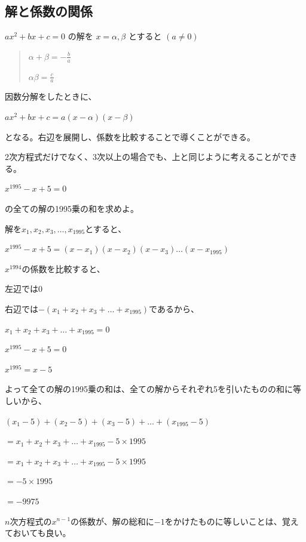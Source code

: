 \documentclass[uplatex,dvipdfmx]{jsbook}
\begin{document}
\subsection{解と係数の関係}

$ax^2+bx+c=0$
の解を
$x=\alpha,\beta$
とすると
$\left(a\neq0\right)$
\begin{quote}
    $\displaystyle \alpha+\beta=-\frac{b}{a}$

    $\displaystyle \alpha\beta=\frac{c}{a}$
\end{quote}
因数分解をしたときに、

$ax^2+bx+c=a\left(x-\alpha\right)\left(x-\beta\right)$

となる。右辺を展開し、係数を比較することで導くことができる。

2次方程式だけでなく、3次以上の場合でも、上と同じように考えることができる。

\begin{problem}[練習問題1]
    $x^{1995}-x+5=0$

    の全ての解の1995乗の和を求めよ。
\end{problem}

\begin{answer}
    解を$x_1,x_2,x_3,\dots,x_{1995}$とすると、

    $x^{1995}-x+5=\left(x-x_1\right)\left(x-x_2\right)\left(x-x_3\right)\dots \left(x-x_{1995}\right)$

    $x^{1994}$の係数を比較すると、

    左辺では$0$

    右辺では$-\left(x_1+x_2+x_3+\dots +x_{1995}\right)$であるから、

    $x_1+x_2+x_3+\dots +x_{1995}=0$

    $x^{1995}-x+5=0$

    $x^{1995}=x-5$

    よって全ての解の1995乗の和は、全ての解からそれぞれ5を引いたものの和に等しいから、

    $\left(x_1-5\right)+\left(x_2-5\right)+\left(x_3-5\right)+\dots +\left(x_{1995}-5\right)$

    $=x_1+x_2+x_3+\dots +x_{1995}-5\times 1995$

    $=x_1+x_2+x_3+\dots +x_{1995}-5\times 1995$

    $=-5\times 1995$

    $=-9975$
\end{answer}
$n$次方程式の$x^{n-1}$の係数が、解の総和に$-1$をかけたものに等しいことは、覚えておいても良い。
\end{document}
